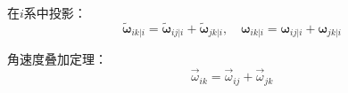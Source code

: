 在$i$系中投影：
\begin{equation}
\tilde{\boldsymbol{\omega}}_{ik|i} = \tilde{\boldsymbol{\omega}}_{ij|i} + \tilde{\boldsymbol{\omega}}_{jk|i}, \quad
\boldsymbol{\omega}_{ik|i} = \boldsymbol{\omega}_{ij|i} + \boldsymbol{\omega}_{jk|i}
\end{equation}

\begin{myformula}
角速度叠加定理：
\begin{equation}
\vec{\omega}_{ik} = \vec{\omega}_{ij} + \vec{\omega}_{jk}
\label{eq:6.5}
\end{equation}
\end{myformula}

